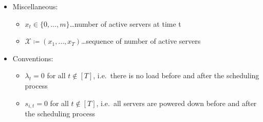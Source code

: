 \documentclass[hidelinks]{article}
\theoremstyle{plain}
\theoremstyle{definition}
\theoremstyle{rem}
\newcommand{\mx}{\mathcal{X}}
\newcommand{\fromto}[2]{\{#1,\ldots,#2\}}
\begin{document}
\begin{itemize}
\item Miscellaneous:
\begin{itemize}
	\item $x_t\in\fromto{0}{m}$\ldots number of active servers at time t
	\item $\mx\coloneqq(x_1,\ldots,x_T)$\ldots sequence of number of active servers
\end{itemize}

\item Conventions:
\begin{itemize}
	\item $\lambda_{t}=0$ for all $t\notin[T]$, i.e.\ there is no load before and after the scheduling process
	\item $s_{i,t}=0$ for all $t\notin[T]$, i.e.\ all servers are powered down before and after the scheduling process
\end{itemize}
\end{itemize}
\normalsize
\end{document}
